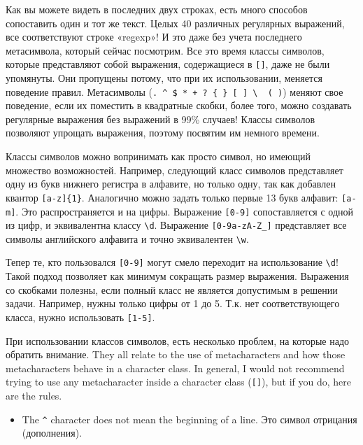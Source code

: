 \documentclass{report}
\begin{document}
Как вы можете видеть в последних двух строках, есть много способов
сопоставить один и тот же текст. Целых 40 различных регулярных
выражений, все соответствуют строке «regexp»! И это даже без учета
последнего метасимвола, который сейчас посмотрим. Все это время классы
символов, которые представляют собой выражения, содержащиеся в
\texttt{{[}{]}}, даже не были упомянуты. Они пропущены потому, что при
их использовании, меняется поведение правил. Метасимволы
(\texttt{.\ \^{}\ \$\ *\ +\ ?\ \{\ \}\ {[}\ {]}\ \textbackslash{}\ \textbar{}\ (\ )})
меняют свое поведение, если их поместить в квадратные скобки, более
того, можно создавать регулярные выражения без выражений в 99\% случаев!
Классы символов позволяют упрощать выражения, поэтому посвятим им
немного времени.

Классы символов можно вопринимать как просто символ, но имеющий
множество возможностей. Например, следующий класс символов представляет
одну из букв нижнего регистра в алфавите, но только одну, так как
добавлен квантор \texttt{{[}a-z{]}\{1\}}. Аналогично можно задать только
первые 13 букв алфавит: \texttt{{[}a-m{]}}. Это распространяется и на
цифры. Выражение \texttt{{[}0-9{]}} сопоставляется с одной из цифр, и
эквивалентна классу \texttt{\textbackslash{}d}. Выражение
\texttt{{[}0-9a-zA-Z\_{]}} представляет все символы английского алфавита
и точно эквивалентен \texttt{\textbackslash{}w}.

Тепер те, кто пользовался \texttt{{[}0-9{]}} могут смело переходит на
использование \texttt{\textbackslash{}d}! Такой подход позволяет как
минимум сокращать размер выражения. Выражения со скобками полезны, если
полный класс не является допустимым в решении задачи. Например, нужны
только цифры от 1 до 5. Т.к. нет соответствующего класса, нужно
использовать \texttt{{[}1-5{]}}.

При использовании классов символов, есть несколько проблем, на которые
надо обратить внимание. They all relate to the use of metacharacters and
how those metacharacters behave in a character class. In general, I
would not recommend trying to use any metacharacter inside a character
class (\texttt{{[}{]}}), but if you do, here are the rules.

\begin{itemize}
\tightlist
\item
  The \texttt{\^{}} character does not mean the beginning of a line. Это
  символ отрицания (дополнения).
\end{itemize}
\end{document}
